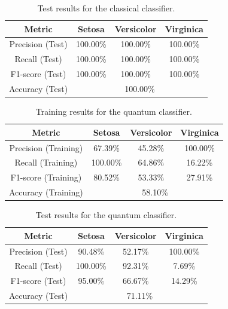 \begin{table}[H]
\centering
\caption{Test results for the classical classifier.}
\small
\begin{tabular}{|c|c|c|c|}
\hline
\textbf{Metric} & \textbf{Setosa} & \textbf{Versicolor} & \textbf{Virginica} \\ \hline
Precision (Test) & 100.00\% & 100.00\% & 100.00\% \\ \hline
Recall (Test) & 100.00\% & 100.00\% & 100.00\% \\ \hline
F1-score (Test) & 100.00\% & 100.00\% & 100.00\% \\ \hline
Accuracy (Test) & \multicolumn{3}{|c|}{100.00\%} \\ \hline
\end{tabular}
\end{table}


\begin{table}[H]
\centering
\caption{Training results for the quantum classifier.}
\small
\begin{tabular}{|c|c|c|c|}
\hline
\textbf{Metric} & \textbf{Setosa} & \textbf{Versicolor} & \textbf{Virginica} \\ \hline
Precision (Training) & 67.39\% & 45.28\% & 100.00\% \\ \hline
Recall (Training) & 100.00\% & 64.86\% & 16.22\% \\ \hline
F1-score (Training) & 80.52\% & 53.33\% & 27.91\% \\ \hline
Accuracy (Training) & \multicolumn{3}{|c|}{58.10\%} \\ \hline
\end{tabular}
\end{table}

\begin{table}[H]
\centering
\caption{Test results for the quantum classifier.}
\small
\begin{tabular}{|c|c|c|c|}
\hline
\textbf{Metric} & \textbf{Setosa} & \textbf{Versicolor} & \textbf{Virginica} \\ \hline
Precision (Test) & 90.48\% & 52.17\% & 100.00\% \\ \hline
Recall (Test) & 100.00\% & 92.31\% & 7.69\% \\ \hline
F1-score (Test) & 95.00\% & 66.67\% & 14.29\% \\ \hline
Accuracy (Test) & \multicolumn{3}{|c|}{71.11\%} \\ \hline
\end{tabular}
\end{table}

